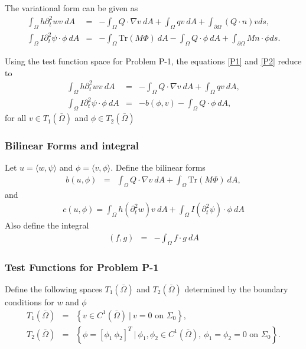 \documentclass[../../main.tex]{subfiles}
\begin{document}
	The variational form can be given as
	\begin{align}
		\int_\Omega h \partial_t^2 w v \ dA & = & - \int_\Omega Q \cdot \nabla v \ dA + \int_\Omega q v \ dA + \int_{\partial\Omega} (Q\cdot n)v ds, \label{P1}\\
		\int_\Omega I \partial_t^2 \psi \cdot \phi \ dA & = & - \int_\Omega \textrm{Tr} (M \Phi) \ dA - \int_\Omega Q \cdot \phi \ dA + \int_{\partial\Omega} M n \cdot \phi ds. \label{P2}
	\end{align}

	Using the test function space for Problem P-1, the equations \eqref{P1} and \eqref{P2} reduce to
	\begin{eqnarray}
		\int_\Omega h \partial_t^2 w v \ dA & = & - \int_\Omega Q \cdot \nabla v \ dA + \int_\Omega q v \ dA, \label{eq:P_Model:ProblemP1V1}\\
		\int_\Omega I \partial_t^2 \psi \cdot \phi \ dA & = & - b(\phi,v) - \int_\Omega Q \cdot \phi \ dA, \label{eq:P_Model:ProblemP1V2}
	\end{eqnarray}
	for all $v \in T_1(\bar{\Omega})$ and $\phi \in T_2(\bar{\Omega})$

	\subsubsection{Bilinear Forms and integral}\label{sssec:P_Model:BilinearForm}
	Let $u = \langle w, \psi \rangle$ and $\phi = \langle v, \phi \rangle$. Define the bilinear forms
	\begin{eqnarray*}
		b(u,\phi) & = & \int_\Omega Q \cdot \nabla v \ dA + \int_{\Omega} \textrm{Tr}(M\Phi) \ dA,
	\end{eqnarray*}
	and
	\begin{eqnarray}
		c(u,\phi) = \int_\Omega h (\partial_t^2 w) v \ dA + \int_\Omega I (\partial_t^2 \psi) \cdot \phi \ dA \label{eq:2D_Model:Bilinear_c}
	\end{eqnarray}
	Also define the integral
	\begin{eqnarray}
		(f,g) &=& -\int_{\Omega} f\cdot g \ dA \label{eq:2D_Model:Bilinear_int}
	\end{eqnarray}
	
	
	\subsubsection{Test Functions for Problem P-1}\label{sssec:P_Model:TestfunctionsP1}
	Define the following spaces $T_1(\bar{\Omega})$ and $T_2(\bar{\Omega})$ determined by the boundary conditions for $w$ and $\phi$
	\begin{eqnarray*}
		T_1(\bar{\Omega}) & = & \left \{v \in C^1(\bar{\Omega})\ | \ v = 0 \textrm{ on } \Sigma_0\right\},\\ 
		T_2(\bar{\Omega}) & = & \left \{ \phi = \left[ \phi_1 \ \phi_2 \right]^T \ | \ \phi_1, \phi_2 \in C^1(\bar{\Omega}), \ \phi_1 = \phi_2 = 0 \textrm{ on } \Sigma_0 \right\}.
	\end{eqnarray*}
	
\end{document}
